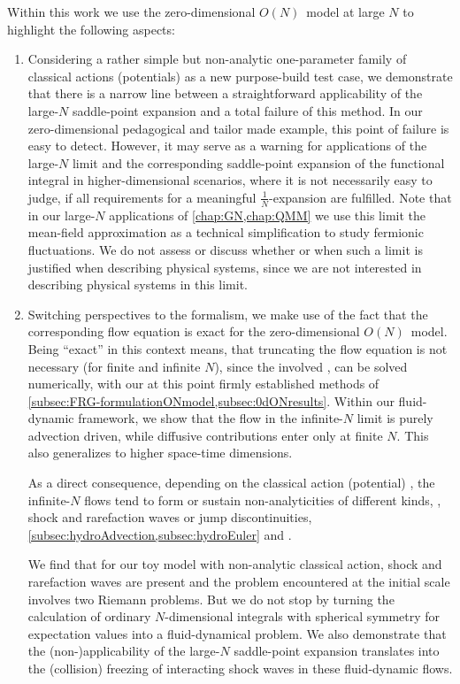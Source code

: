 Within this work we use the zero-dimensional $O(N)$~model at large $N$ to highlight the following aspects:
	\begin{enumerate}
		\item	Considering a rather simple \dash{} but non-analytic \dash{} one-parameter family of classical actions (potentials) as a new purpose-build test case, we demonstrate that there is a narrow line between a straightforward applicability of the large-$N$ saddle-point expansion and a total failure of this method. 
		In our zero-dimensional pedagogical and tailor made example, this point of failure is easy to detect. 
		However, it may serve as a warning for applications of the large-$N$ limit and the corresponding saddle-point expansion of the functional integral in higher-dimensional scenarios, where it is not necessarily easy to judge, if all requirements for a meaningful $\tfrac{1}{N}$-expansion are fulfilled.
		Note that in our large-$N$ applications of \cref{chap:GN,chap:QMM} we use this limit \dash{} the mean-field \dash{} approximation as a technical simplification to study fermionic fluctuations.
		We do not assess or discuss whether or when such a limit is justified when describing physical systems, since we are not interested in describing physical systems in this limit.
		
		\item	Switching perspectives to the \frg{}  formalism, we make use of the fact that the corresponding \frg{} flow equation is exact for the zero-dimensional $O(N)$~model. 
		Being ``exact'' in this context means, that truncating the flow equation is not necessary (for finite and infinite $N$), since the involved \pdes{}, can be solved numerically, with our at this point firmly established methods of \cref{subsec:FRG-formulationONmodel,subsec:0dONresults}.
		Within our fluid-dynamic framework, we show that the \frg{} flow in the infinite-$N$ limit is purely advection driven, while diffusive contributions enter only at finite $N$.
		This also generalizes to higher space-time dimensions.
		
		As a direct consequence, depending on the classical action (potential) \dash{} \uv{} \ic{}, the infinite-$N$ \frg{} flows tend to form or sustain non-analyticities of different kinds, \eg{}, shock and rarefaction waves or jump discontinuities, \cf{} \cref{subsec:hydroAdvection,subsec:hydroEuler} and . 
			
		We find that for our toy model with non-analytic classical action, shock and rarefaction waves are present and the problem encountered at the \uv{} initial scale involves two Riemann problems.
		But we do not stop by turning the calculation of ordinary $N$-dimensional integrals with spherical symmetry for expectation values into a fluid-dynamical problem. 
		We also demonstrate that the (non\nobreakdash-)applicability of the large-$N$ saddle-point expansion translates into the (collision) freezing of interacting shock waves in these fluid-dynamic \frg{} flows.
					

\end{enumerate}

